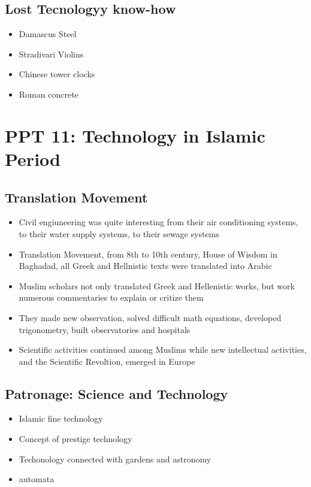 \documentclass{article}
\begin{document}
\subsection{Lost Tecnologyy know-how}
\begin{itemize}
  \item Damascus Steel
  \item Stradivari Violins
  \item Chinese tower clocks
  \item Roman concrete
\end{itemize}


\section{PPT 11: Technology in Islamic Period}

\subsection{Translation Movement}
\begin{itemize}
  \item Civil engiuneering was quite interesting from their air conditioning systems,
    to their water supply systems, to their sewage systems
  \item Translation Movement, from 8th to 10th century,
    House of Wisdom in Baghadad,
    all Greek and Hellnistic texts were translated into Arabic
  \item Muslim scholars not only translated Greek and Hellenistic works, but work numerous
    commentaries to explain or critize them
  \item They made new observation, solved difficult math equations, developed trigonometry,
    built observatories and hospitals
  \item Scientific activities continued among Muslims while new intellectual
    activities, and the Scientific Revoltion, emerged in Europe
\end{itemize}

\subsection{Patronage: Science and Technology}
\begin{itemize}
  \item Islamic fine technology
  \item Concept of prestige technology
  \item Techonology connected with gardens and astronomy
  \item automata
\end{itemize}
\end{document}
